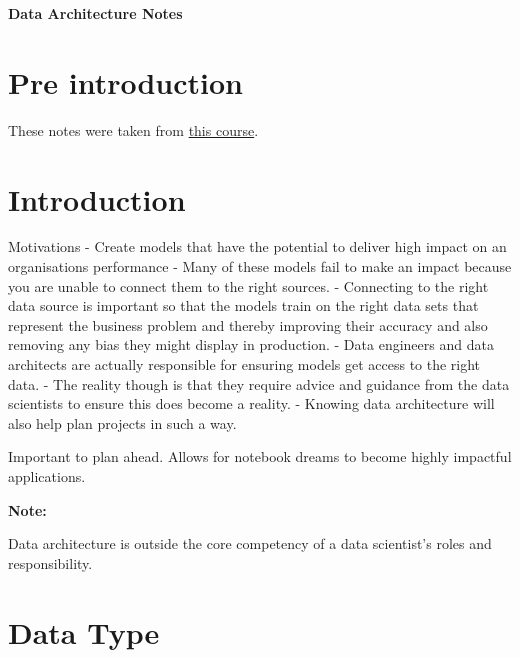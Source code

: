 \documentclass[a4paper, 11pt]{article}
\newenvironment{note}{
    \begin{siderule}\textbf{Note: }
    }{\end{siderule}}
\begin{document}
    \begin{titlepage}
        \centering
        \vspace*{2in}
        \Huge \textbf{Data Architecture Notes}
    \end{titlepage}

    \setcounter{section}{0}

    \newpage

    \tableofcontents
    \newpage

    \section{Pre introduction}
    These notes were taken from \href{https://www.udemy.com/course/data-architecture-for-data-scientists}{this course}.

    \section{Introduction}
    Motivations
    - Create models that have the potential to deliver high impact on an organisations performance
    - Many of these models fail to make an impact because you are unable to connect them to the right sources.
    - Connecting to the right data source is important so that the models train on the right data sets that represent the business problem and thereby improving their accuracy and also removing any bias they might display in production.
    - Data engineers and data architects are actually responsible for ensuring models get access to the right data.
    - The reality though is that they require advice and guidance from the data scientists to ensure this does become a reality.
    - Knowing data architecture will also help plan projects in such a way.

    Important to plan ahead.
    Allows for notebook dreams to become highly impactful applications.

    \begin{note}
        Data architecture is outside the core competency of a data scientist’s roles and responsibility.
    \end{note}


    \section{Data Type}
\end{document}
